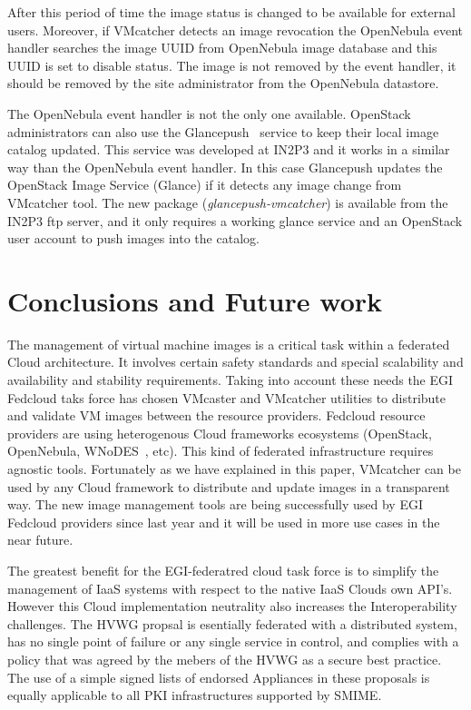 \documentclass{cai}
\begin{document}
After this period of time the image status is changed to be available for external users. 
Moreover, if VMcatcher detects an image revocation the OpenNebula event handler searches the image UUID from OpenNebula image database and this UUID is set to disable status.
The image is not removed by the event handler, it should be removed by the site administrator from the OpenNebula datastore.

The OpenNebula event handler is not the only one available. OpenStack administrators can also use the Glancepush~\cite{glancepush} service to keep their local image catalog updated. 
This service was developed at IN2P3 and it works in a similar way than the OpenNebula event handler. 
In this case Glancepush updates the OpenStack Image Service (Glance) if it detects any image change from VMcatcher tool. 
The new package (\textit{glancepush-vmcatcher}) is available from the IN2P3 ftp server, and it only requires a working glance service and an OpenStack user account to push images into the catalog.


\section{Conclusions and Future work}
\label{sect-conclusions}
The management of virtual machine images is a critical task within a federated Cloud architecture. It involves certain safety standards and special scalability and availability and stability requirements.
Taking into account these needs the EGI Fedcloud taks force has chosen VMcaster and VMcatcher utilities to distribute and validate VM images between the resource providers.
Fedcloud resource providers are using heterogenous Cloud frameworks ecosystems (OpenStack, OpenNebula, WNoDES~\cite{wnodes}, etc). This kind of federated infrastructure requires agnostic tools.
Fortunately as we have explained in this paper, VMcatcher can be used by any Cloud framework to distribute and update images in a transparent way. 
The new image management tools are being successfully used by EGI Fedcloud providers since last year and it will be used in more use cases in the near future.

The greatest benefit for the EGI-federatred cloud task force is to simplify the management of IaaS systems with respect to the native IaaS Clouds own API's. 
However this Cloud implementation neutrality also increases the Interoperability challenges. 
The HVWG propsal is esentially federated with a distributed system, has no single point of failure or any single service in control, and complies with a policy that was agreed by the mebers of the HVWG as a secure best practice.
The use of a simple signed lists of endorsed Appliances in these proposals is equally applicable to all PKI infrastructures supported by SMIME. 
\end{document}
